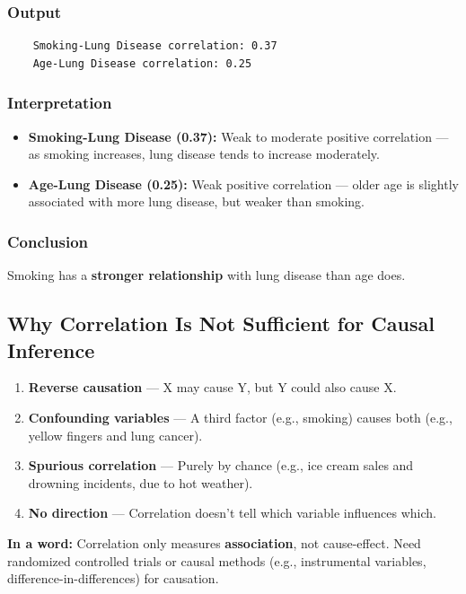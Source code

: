 \documentclass[a4paper,12pt]{article}
\begin{document}
\subsubsection{Output}
\begin{verbatim}
	Smoking-Lung Disease correlation: 0.37
	Age-Lung Disease correlation: 0.25
\end{verbatim}

\subsubsection{Interpretation}
\begin{itemize}
	\item \textbf{Smoking-Lung Disease (0.37):} Weak to moderate positive correlation — as smoking increases, lung disease tends to increase moderately.
	\item \textbf{Age-Lung Disease (0.25):} Weak positive correlation — older age is slightly associated with more lung disease, but weaker than smoking.
\end{itemize}

\subsubsection{Conclusion}
Smoking has a \textbf{stronger relationship} with lung disease than age does.
\subsection{Why Correlation Is Not Sufficient for Causal Inference}

\begin{enumerate}
	\item \textbf{Reverse causation} — X may cause Y, but Y could also cause X.
	\item \textbf{Confounding variables} — A third factor (e.g., smoking) causes both (e.g., yellow fingers and lung cancer).
	\item \textbf{Spurious correlation} — Purely by chance (e.g., ice cream sales and drowning incidents, due to hot weather).
	\item \textbf{No direction} — Correlation doesn't tell which variable influences which.
\end{enumerate}

\textbf{In a word:} Correlation only measures \textbf{association}, not cause-effect. 
Need randomized controlled trials or causal methods (e.g., instrumental variables, difference-in-differences) for causation.
\end{document}
